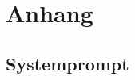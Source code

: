 \clearpage
\setcounter{secnumdepth}{0}

\chapter*{\textbf{Anhang}}\label{appendix}








\section*{Systemprompt}
\label{sec:appendix-systemprompt}

